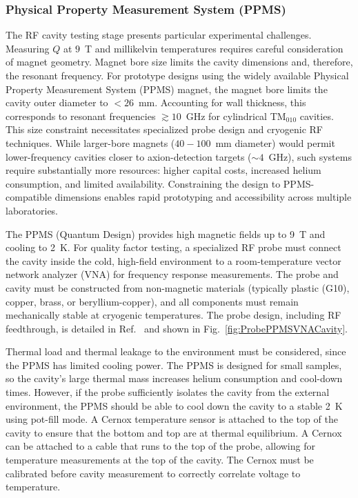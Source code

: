     \subsubsection{Physical Property Measurement System (PPMS)}

    The RF cavity testing stage presents particular experimental challenges. Measuring $Q$ at $9$~T and millikelvin temperatures requires careful consideration of magnet geometry. Magnet bore size limits the cavity dimensions and, therefore, the resonant frequency. For prototype designs using the widely available Physical Property Measurement System (PPMS) magnet, the magnet bore limits the cavity outer diameter to $<26$~mm. Accounting for wall thickness, this corresponds to resonant frequencies $\gtrsim 10$~GHz for cylindrical TM$_{010}$ cavities. This size constraint necessitates specialized probe design and cryogenic RF techniques. While larger-bore magnets ($40-100$~mm diameter) would permit lower-frequency cavities closer to axion-detection targets ($\sim4$~GHz), such systems require substantially more resources: higher capital costs, increased helium consumption, and limited availability. Constraining the design to PPMS-compatible dimensions enables rapid prototyping and accessibility across multiple laboratories.


    The PPMS (Quantum Design) provides high magnetic fields up to 9~T and cooling to 2~K. For quality factor testing, a specialized RF probe must connect the cavity inside the cold, high-field environment to a room-temperature vector network analyzer (VNA) for frequency response measurements. The probe and cavity must be constructed from non-magnetic materials (typically plastic (G10), copper, brass, or beryllium-copper), and all components must remain mechanically stable at cryogenic temperatures. The probe design, including RF feedthrough, is detailed in Ref.~\cite{Braine:2024nzi} and shown in Fig.~\ref{fig:ProbePPMSVNACavity}.

    Thermal load and thermal leakage to the environment must be considered, since the PPMS has limited cooling power. The PPMS is designed for small samples, so the cavity's large thermal mass increases helium consumption and cool-down times. However, if the probe sufficiently isolates the cavity from the external environment, the PPMS should be able to cool down the cavity to a stable 2~K using pot-fill mode. A Cernox temperature sensor is attached to the top of the cavity to ensure that the bottom and top are at thermal equilibrium. A Cernox can be attached to a cable that runs to the top of the probe, allowing for temperature measurements at the top of the cavity. The Cernox must be calibrated before cavity measurement to correctly correlate voltage to temperature.


